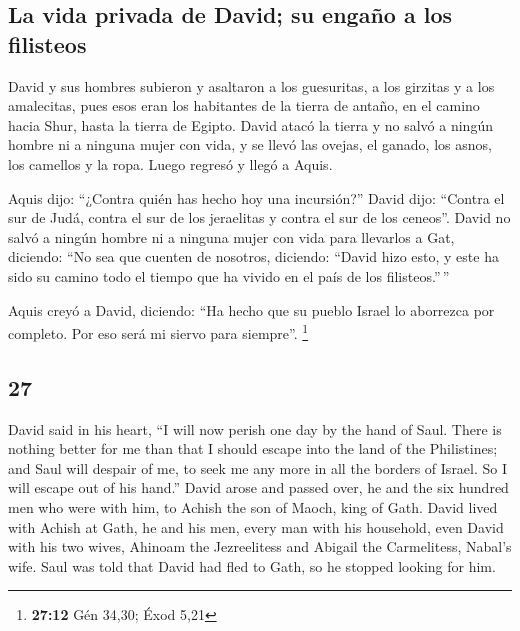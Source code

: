 \begin{paracol}{2}
\hypertarget{la-vida-privada-de-david-su-engauxf1o-a-los-filisteos}{%
\subsection{La vida privada de David; su engaño a los
filisteos}\label{la-vida-privada-de-david-su-engauxf1o-a-los-filisteos}}

 David y sus hombres subieron y asaltaron a los
guesuritas, a los girzitas y a los amalecitas, pues esos eran los
habitantes de la tierra de antaño, en el camino hacia Shur, hasta la
tierra de Egipto.  David atacó la tierra y no salvó a
ningún hombre ni a ninguna mujer con vida, y se llevó las ovejas, el
ganado, los asnos, los camellos y la ropa. Luego regresó y llegó a
Aquis.

 Aquis dijo: ``¿Contra quién has hecho hoy una
incursión?'' David dijo: ``Contra el sur de Judá, contra el sur de los
jeraelitas y contra el sur de los ceneos''.  David no
salvó a ningún hombre ni a ninguna mujer con vida para llevarlos a Gat,
diciendo: ``No sea que cuenten de nosotros, diciendo: ``David hizo esto,
y este ha sido su camino todo el tiempo que ha vivido en el país de los
filisteos.''\,''

 Aquis creyó a David, diciendo: ``Ha hecho que su pueblo
Israel lo aborrezca por completo. Por eso será mi siervo para siempre''.
\footnote{\textbf{27:12} Gén 34,30; Éxod 5,21}

\switchcolumn
\begin{otherlanguage}{english}

\hypertarget{section-53}{%
\section{27}\label{section-53}}

 David said in his heart, ``I will now perish one day by
the hand of Saul. There is nothing better for me than that I should
escape into the land of the Philistines; and Saul will despair of me, to
seek me any more in all the borders of Israel. So I will escape out of
his hand.''  David arose and passed over, he and the six
hundred men who were with him, to Achish the son of Maoch, king of Gath.
 David lived with Achish at Gath, he and his men, every
man with his household, even David with his two wives, Ahinoam the
Jezreelitess and Abigail the Carmelitess, Nabal's wife. 
Saul was told that David had fled to Gath, so he stopped looking for
him.


\end{otherlanguage}
\end{paracol}
